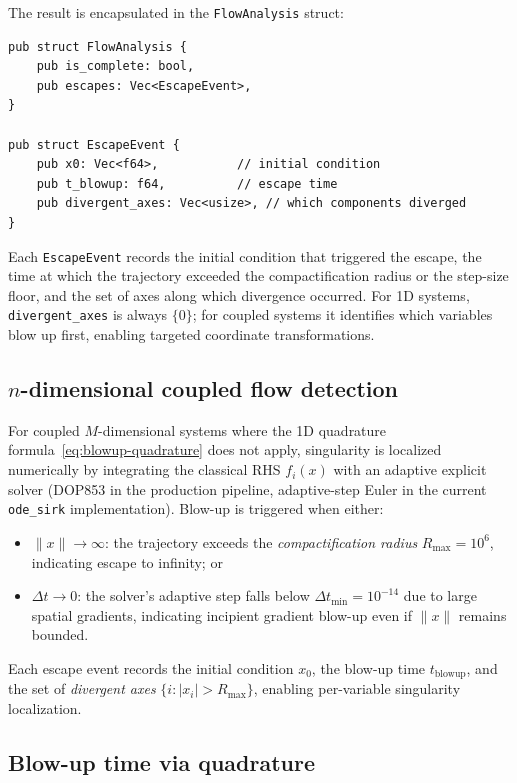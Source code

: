 \documentclass[11pt,a4paper]{article}
\begin{document}
The result is encapsulated in the \texttt{FlowAnalysis} struct:
\begin{lstlisting}[language={},caption={\texttt{flow.rs}}]
pub struct FlowAnalysis {
    pub is_complete: bool,
    pub escapes: Vec<EscapeEvent>,
}

pub struct EscapeEvent {
    pub x0: Vec<f64>,           // initial condition
    pub t_blowup: f64,          // escape time
    pub divergent_axes: Vec<usize>, // which components diverged
}
\end{lstlisting}
Each \texttt{EscapeEvent} records the initial condition that triggered
the escape, the time at which the trajectory exceeded the
compactification radius or the step-size floor, and the set of axes
along which divergence occurred.  For 1D systems,
\texttt{divergent\_axes} is always $\{0\}$; for coupled systems it
identifies which variables blow up first, enabling targeted coordinate
transformations.

\subsection{$n$-dimensional coupled flow detection}

For coupled $M$-dimensional systems where the 1D quadrature
formula~\eqref{eq:blowup-quadrature} does not apply, singularity is
localized numerically by integrating the classical RHS $f_{i}(x)$ with
an adaptive explicit solver (DOP853 in the production pipeline,
adaptive-step Euler in the current \texttt{ode\_sirk} implementation).
Blow-up is triggered when either:
\begin{itemize}
  \item $\lVert x\rVert\to\infty$: the trajectory exceeds the
    \emph{compactification radius} $R_{\max}=10^{6}$, indicating escape
    to infinity; or
  \item $\Delta t\to 0$: the solver's adaptive step falls below
    $\Delta t_{\min}=10^{-14}$ due to large spatial gradients,
    indicating incipient gradient blow-up even if $\lVert x\rVert$
    remains bounded.
\end{itemize}
Each escape event records the initial condition $x_{0}$, the blow-up
time $t_{\text{blowup}}$, and the set of \emph{divergent axes}
$\{i:\lvert x_{i}\rvert>R_{\max}\}$, enabling per-variable singularity
localization.

\subsection{Blow-up time via quadrature}
\end{document}
